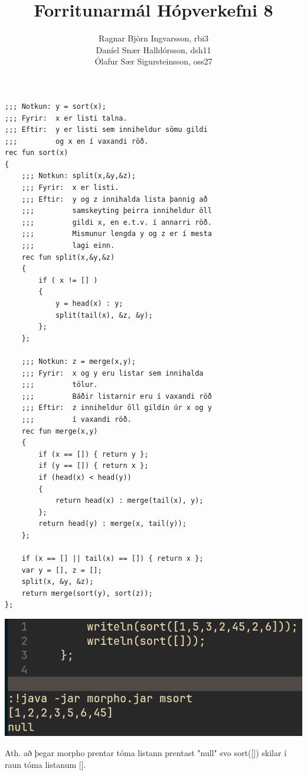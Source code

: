 \documentclass{article}
\title{Forritunarmál Hópverkefni 8}
\author{Ragnar Björn Ingvarsson, rbi3 \\
		Daníel Snær Halldórsson, dsh11 \\
		Ólafur Sær Sigursteinsson, oss27}
\begin{document}
\renewcommand\thepage{}
	
	\maketitle

	\newpage
	\setcounter{page}{1}
	\renewcommand\thepage{\arabic{page}}

	\section{}
	\begin{verbatim}
;;; Notkun: y = sort(x);
;;; Fyrir:  x er listi talna.
;;; Eftir:  y er listi sem inniheldur sömu gildi
;;;         og x en í vaxandi röð.
rec fun sort(x)
{
    ;;; Notkun: split(x,&y,&z);
    ;;; Fyrir:  x er listi.
    ;;; Eftir:  y og z innihalda lista þannig að
    ;;;         samskeyting þeirra inniheldur öll
    ;;;         gildi x, en e.t.v. í annarri röð.
    ;;;         Mismunur lengda y og z er í mesta
    ;;;         lagi einn.
    rec fun split(x,&y,&z)
    {
        if ( x != [] )
        {
            y = head(x) : y;
            split(tail(x), &z, &y);
        };
    };
    
    ;;; Notkun: z = merge(x,y);
    ;;; Fyrir:  x og y eru listar sem innihalda
    ;;;         tölur.
    ;;;         Báðir listarnir eru í vaxandi röð
    ;;; Eftir:  z inniheldur öll gildin úr x og y
    ;;;         í vaxandi röð.
    rec fun merge(x,y)
    {
        if (x == []) { return y };				
        if (y == []) { return x };
        if (head(x) < head(y))
        {
            return head(x) : merge(tail(x), y);
        };
        return head(y) : merge(x, tail(y));
    };
    
    if (x == [] || tail(x) == []) { return x };
    var y = [], z = [];
    split(x, &y, &z);
    return merge(sort(y), sort(z));
};
	\end{verbatim}
	\begin{center}
		\includegraphics[scale=0.35]{msort.png}
	\end{center}
	Ath. að þegar morpho prentar tóma listann prentast "null" svo sort([]) 
	skilar í raun tóma listanum [].
\end{document}
